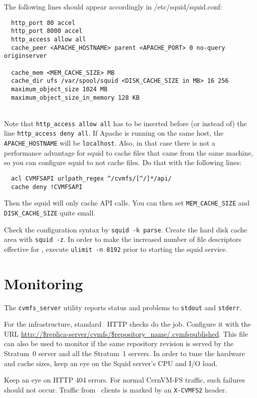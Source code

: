 The following lines should appear accordingly in /etc/squid/squid.conf:
\begin{verbatim}
  http_port 80 accel
  http_port 8000 accel
  http_access allow all
  cache_peer <APACHE_HOSTNAME> parent <APACHE_PORT> 0 no-query originserver

  cache_mem <MEM_CACHE_SIZE> MB
  cache_dir ufs /var/spool/squid <DISK_CACHE_SIZE in MB> 16 256
  maximum_object_size 1024 MB
  maximum_object_size_in_memory 128 KB
\end{verbatim}
\quad\\
Note that \texttt{http\_access allow all} has to be inserted before (or instead of) the line \texttt{http\_access deny all}.
If Apache is running on the same host, the \texttt{APACHE\_HOSTNAME}
will be \texttt{localhost}.  Also, in that case there is not a
performance advantage for squid to cache files that came from the same
machine, so you can configure squid to not cache files.  Do that with
the following lines:
\begin{verbatim}
  acl CVMFSAPI urlpath_regex ^/cvmfs/[^/]*/api/
  cache deny !CVMFSAPI
\end{verbatim}
Then the squid will only cache API calls.  You can then set
\texttt{MEM\_CACHE\_SIZE} and \texttt{DISK\_CACHE\_SIZE} quite small.

Check the configuration syntax by \texttt{squid -k parse}.
Create the hard disk cache area with \texttt{squid -z}. 
In order to make the increased number of file descriptors effective for \squid, execute \texttt{ulimit -n 8192} prior to starting the squid service.

\section{Monitoring}
The \texttt{cvmfs\_server} utility reports status and problems to \texttt{stdout} and \texttt{stderr}.

For the infrastructure, standard \nagios\ HTTP checks do the job.
Configure it with the URL \url{http://$replica-server/cvmfs/$repository_name/.cvmfspublished}.
This file can also be used to monitor if the same repository revision is served by the Stratum~0 server and all the Stratum~1 servers.
In order to tune the hardware and cache sizes, keep an eye on the Squid server's CPU and I/O load.

Keep an eye on HTTP 404 errors.
For normal CernVM-FS traffic, such failures should not occur.
Traffic from \cvmfs\ clients is marked by an \texttt{X-CVMFS2} header.
